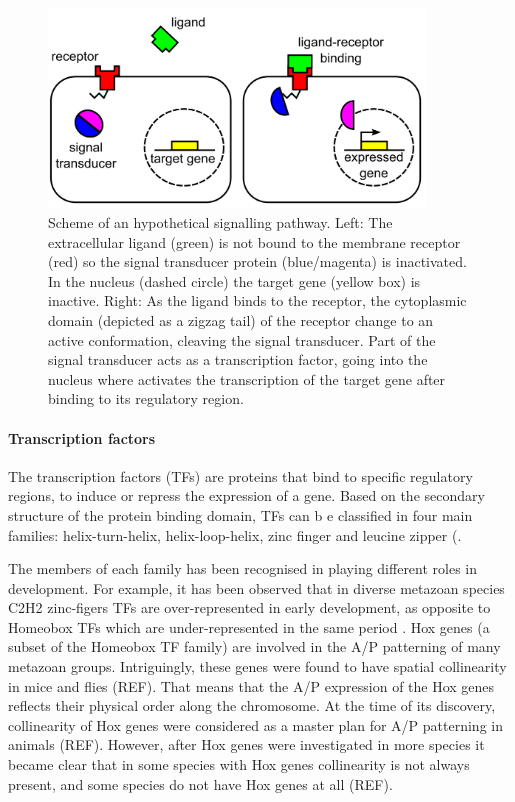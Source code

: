 \begin{figure}[h]
  \includegraphics[width=10cm]{./Images/signalling.png}
  \centering
  \caption{
  Scheme of an hypothetical signalling pathway. Left: The extracellular ligand (green) is not bound to the membrane receptor (red) so the signal transducer protein (blue/magenta) is inactivated. In the nucleus (dashed circle) the target gene (yellow box) is inactive. Right: As the ligand binds to the receptor, the cytoplasmic domain (depicted as a zigzag tail) of the receptor change to an active conformation, cleaving the signal transducer. Part of the signal transducer acts as a transcription factor, going into the nucleus where activates the transcription of the target gene after binding to its regulatory region.
 }
  \label{fig:Signalling}
\end{figure}

\paragraph{Transcription factors} The transcription factors (TFs) are proteins that bind to specific regulatory regions, to induce or repress the expression of a gene.
Based on the secondary structure of the protein binding domain, TFs can b e classified in four main families: helix-turn-helix, helix-loop-helix, zinc finger and leucine zipper (\citep{Carroll2001}.
	
The members of each family has been recognised in playing different roles in development. For example, it has been observed that in diverse metazoan species C2H2 zinc-figers TFs are over-represented in early development, as opposite to Homeobox TFs which are under-represented in the same period \citep{Schep2013}.
Hox genes (a subset of the Homeobox TF family) are involved in the A/P patterning of many metazoan groups. Intriguingly, these genes were found to have spatial collinearity in mice and flies (REF). That means that the A/P expression of the Hox genes reflects their physical order along the chromosome.
At the time of its discovery, collinearity of Hox genes were considered as a master plan for A/P patterning in animals (REF).
However, after Hox genes were investigated in more species it became clear that in some species with Hox genes collinearity is not always present, and some species do not have Hox genes at all (REF).

